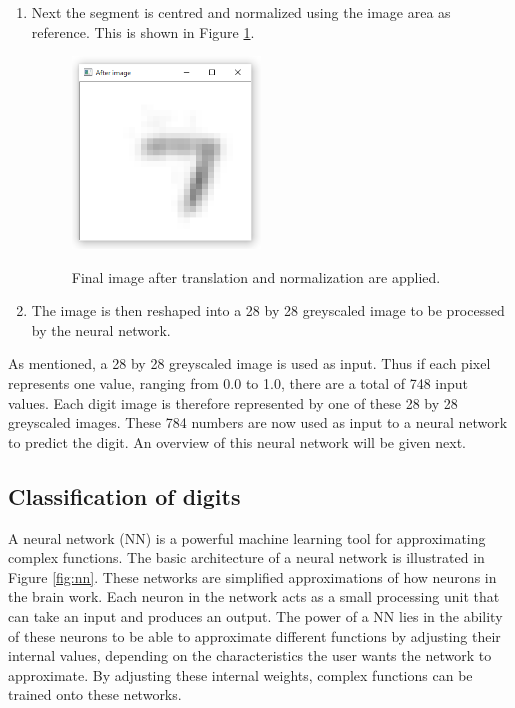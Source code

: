 \begin{enumerate}
\item Next the segment is centred and normalized using the image area as reference.  This is shown in Figure \ref{fig:final}.

\begin{figure}
  \centering
  \includegraphics[width=5cm]{TranslateAndScale}\\
  \caption{Final image after translation and normalization are applied.}
  \label{fig:final}
\end{figure}

\item The image is then reshaped into a 28 by 28 greyscaled image to be processed by the neural network.
\end{enumerate}
As mentioned, a 28 by 28 greyscaled image is used as input. Thus if each pixel represents one value, ranging from 0.0 to 1.0, there are a total of 748 input values. Each digit image is therefore represented by  one of these 28 by 28 greyscaled images. These 784 numbers are now used as input to a neural network to predict the digit. An overview of this neural network will be given next.

\subsection{Classification of digits}

A neural network (NN) is a powerful machine learning tool for approximating complex functions. The basic architecture of a neural network is illustrated in Figure \ref{fig:nn}. These networks are simplified approximations of how neurons in the brain work. Each neuron in the network acts as a small processing unit that can take an input and produces an output. The power of a NN lies in the ability of these neurons to be able to approximate different functions by adjusting their internal values, depending on the characteristics the user wants the network to approximate. By adjusting these internal weights, complex functions can be trained onto these networks.

